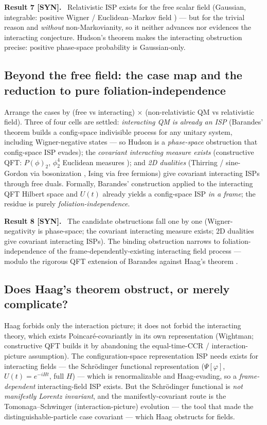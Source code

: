 \documentclass[aps,prd,preprint,amsmath,amssymb,nofootinbib,superscriptaddress]{revtex4-2}
\newenvironment{result}[1]{\par\medskip\noindent\textbf{#1}\ }{\par\medskip}
\begin{document}
\begin{result}{Result 7 [SYN].}
Relativistic ISP exists for the free scalar field (Gaussian, integrable: positive Wigner
\cite{Hudson1974} / Euclidean--Markov field \cite{GuerraRuggiero1973}) --- but for the trivial
reason and \emph{without} non-Markovianity, so it neither advances nor evidences the
interacting conjecture. Hudson's theorem makes the interacting obstruction precise: positive
phase-space probability is Gaussian-only.
\end{result}

\subsection{Beyond the free field: the case map and the reduction to pure foliation-independence}
Arrange the cases by (free vs interacting) $\times$ (non-relativistic QM vs relativistic
field). Three of four cells are settled: \emph{interacting QM is already an ISP} (Barandes'
theorem builds a config-space indivisible process for any unitary system, including
Wigner-negative states --- so Hudson is a \emph{phase-space} obstruction that config-space ISP
evades); the \emph{covariant interacting measure exists} (constructive QFT: $P(\phi)_2$,
$\phi^4_2$ Euclidean measures \cite{GlimmJaffe1987}); and \emph{2D dualities} (Thirring /
sine-Gordon via bosonization \cite{Coleman1975}, Ising via free fermions) give covariant
interacting ISPs through free duals. Formally, Barandes' construction applied to the
interacting QFT Hilbert space and $U(t)$ already yields a config-space ISP \emph{in a frame};
the residue is purely \emph{foliation-independence}.

\begin{result}{Result 8 [SYN].}
The candidate obstructions fall one by one (Wigner-negativity is phase-space; the covariant
interacting measure exists; 2D dualities give covariant interacting ISPs). The binding
obstruction narrows to foliation-independence of the frame-dependently-existing interacting
field process --- modulo the rigorous QFT extension of Barandes against Haag's theorem
\cite{StreaterWightman1964}.
\end{result}

\subsection{Does Haag's theorem obstruct, or merely complicate?}
Haag forbids only the interaction picture; it does not forbid the interacting theory, which
exists Poincar\'e-covariantly in its own representation (Wightman; constructive QFT
\cite{GlimmJaffe1987} builds it by abandoning the equal-time-CCR / interaction-picture
assumption). The configuration-space representation ISP needs exists for interacting fields ---
the Schr\"odinger functional representation ($\Psi[\varphi]$, $U(t)=e^{-iHt}$, full $H$) ---
which is renormalizable \cite{Symanzik1981} and Haag-evading, so a \emph{frame-dependent}
interacting-field ISP exists. But the Schr\"odinger functional is \emph{not manifestly Lorentz
invariant}, and the manifestly-covariant route is the Tomonaga--Schwinger (interaction-picture)
evolution --- the tool that made the distinguishable-particle case covariant --- which Haag
obstructs for fields.
\end{document}
